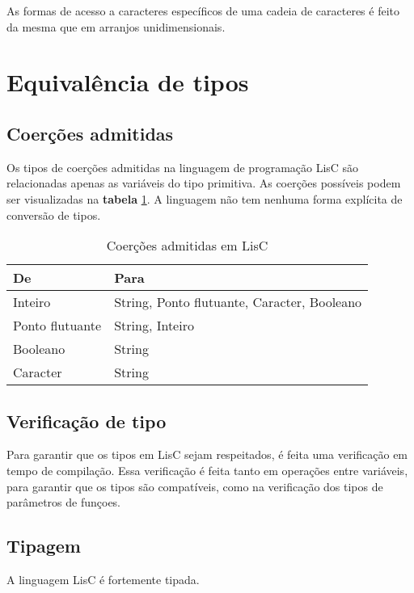 \documentclass[
  12pt,				%
  oneside,			%
  a4paper,			%
  english,			%
  french,				%
  spanish,			%
  brazil,				%
]{abntex2}
\begin{document}
As formas de acesso a caracteres específicos de uma cadeia de
caracteres é feito da mesma que em arranjos unidimensionais.


\section{Equivalência de tipos}
\label{sec:equivalencia-de-tipos}

\subsection{Coerções admitidas}
\label{subsec:coercoes-admitidas}

Os tipos de coerções admitidas na linguagem de programação LisC são
relacionadas apenas as variáveis do tipo primitiva. As coerções
possíveis podem ser visualizadas na \textbf{tabela}
\ref{tab:coercoes}. A linguagem não tem nenhuma forma explícita de
conversão de tipos.

\begin{table}[H]
  \centering
  \caption{Coerções admitidas em LisC}
  \label{tab:coercoes}
  \begin{tabular}{|l|l|}
    \hline
    De & Para \\ \hline
    Inteiro & String, Ponto flutuante, Caracter, Booleano \\ 
    Ponto flutuante & String, Inteiro \\     
    Booleano & String \\ 
    Caracter & String \\     \hline
  \end{tabular}
\end{table}

\subsection{Verificação de tipo}
\label{subsec:verificacao-de-tipo}

Para garantir que os tipos em LisC sejam respeitados, é feita uma
verificação em tempo de compilação. Essa verificação é feita tanto em
operações entre variáveis, para garantir que os tipos são compatíveis,
como na verificação dos tipos de parâmetros de funçoes.

\subsection{Tipagem}
\label{subsec:tipagem}

A linguagem LisC é fortemente tipada.
\end{document}
